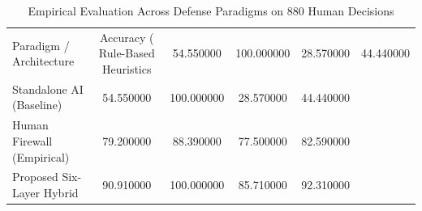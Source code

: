 \begin{table}
\caption{Empirical Evaluation Across Defense Paradigms on 880 Human Decisions}
\label{tab:survey_comparison}
\begin{tabular}{lcccc}
\toprule
Paradigm / Architecture & Accuracy (%
\midrule
Rule-Based Heuristics & 54.550000 & 100.000000 & 28.570000 & 44.440000 \\
Standalone AI (Baseline) & 54.550000 & 100.000000 & 28.570000 & 44.440000 \\
Human Firewall (Empirical) & 79.200000 & 88.390000 & 77.500000 & 82.590000 \\
Proposed Six-Layer Hybrid & 90.910000 & 100.000000 & 85.710000 & 92.310000 \\
\bottomrule
\end{tabular}
\end{table}
